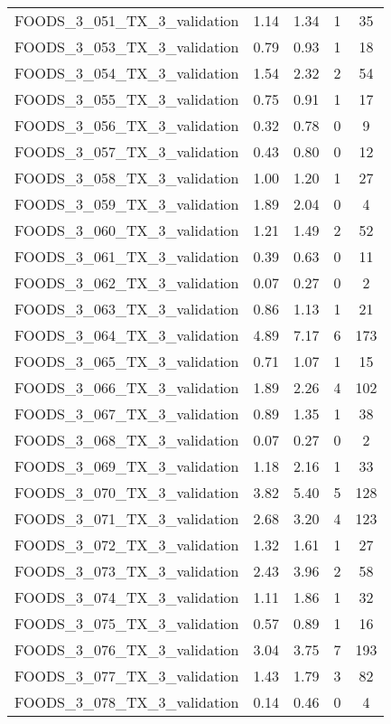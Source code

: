 \begin{table}
\begin{tabular}{|l|c|c|c|c|}
FOODS\_3\_051\_TX\_3\_validation & 1.14 & 1.34 & 1 & 35 \\
FOODS\_3\_053\_TX\_3\_validation & 0.79 & 0.93 & 1 & 18 \\
FOODS\_3\_054\_TX\_3\_validation & 1.54 & 2.32 & 2 & 54 \\
FOODS\_3\_055\_TX\_3\_validation & 0.75 & 0.91 & 1 & 17 \\
FOODS\_3\_056\_TX\_3\_validation & 0.32 & 0.78 & 0 & 9 \\
FOODS\_3\_057\_TX\_3\_validation & 0.43 & 0.80 & 0 & 12 \\
FOODS\_3\_058\_TX\_3\_validation & 1.00 & 1.20 & 1 & 27 \\
FOODS\_3\_059\_TX\_3\_validation & 1.89 & 2.04 & 0 & 4 \\
FOODS\_3\_060\_TX\_3\_validation & 1.21 & 1.49 & 2 & 52 \\
FOODS\_3\_061\_TX\_3\_validation & 0.39 & 0.63 & 0 & 11 \\
FOODS\_3\_062\_TX\_3\_validation & 0.07 & 0.27 & 0 & 2 \\
FOODS\_3\_063\_TX\_3\_validation & 0.86 & 1.13 & 1 & 21 \\
FOODS\_3\_064\_TX\_3\_validation & 4.89 & 7.17 & 6 & 173 \\
FOODS\_3\_065\_TX\_3\_validation & 0.71 & 1.07 & 1 & 15 \\
FOODS\_3\_066\_TX\_3\_validation & 1.89 & 2.26 & 4 & 102 \\
FOODS\_3\_067\_TX\_3\_validation & 0.89 & 1.35 & 1 & 38 \\
FOODS\_3\_068\_TX\_3\_validation & 0.07 & 0.27 & 0 & 2 \\
FOODS\_3\_069\_TX\_3\_validation & 1.18 & 2.16 & 1 & 33 \\
FOODS\_3\_070\_TX\_3\_validation & 3.82 & 5.40 & 5 & 128 \\
FOODS\_3\_071\_TX\_3\_validation & 2.68 & 3.20 & 4 & 123 \\
FOODS\_3\_072\_TX\_3\_validation & 1.32 & 1.61 & 1 & 27 \\
FOODS\_3\_073\_TX\_3\_validation & 2.43 & 3.96 & 2 & 58 \\
FOODS\_3\_074\_TX\_3\_validation & 1.11 & 1.86 & 1 & 32 \\
FOODS\_3\_075\_TX\_3\_validation & 0.57 & 0.89 & 1 & 16 \\
FOODS\_3\_076\_TX\_3\_validation & 3.04 & 3.75 & 7 & 193 \\
FOODS\_3\_077\_TX\_3\_validation & 1.43 & 1.79 & 3 & 82 \\
FOODS\_3\_078\_TX\_3\_validation & 0.14 & 0.46 & 0 & 4 \\

\end{tabular}
\end{table}
